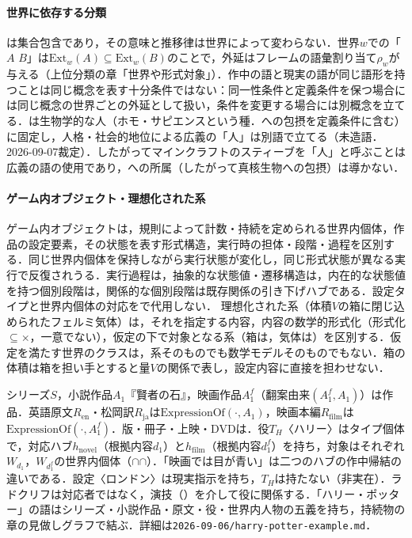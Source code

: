 \documentclass[../../main-detail.tex]{subfiles}
\begin{document}
\paragraph{世界に依存する分類} は集合包含であり，その意味と推移律は世界によって変わらない．世界$w$での「$A$  $B$」は$\mathrm{Ext}_w(A)\subseteq\mathrm{Ext}_w(B)$のことで，外延はフレームの語彙割り当て$\rho_w$が与える（上位分類の章「世界や形式対象」）．作中の語と現実の語が同じ語形を持つことは同じ概念を表す十分条件ではない：同一性条件と定義条件を保つ場合には同じ概念の世界ごとの外延として扱い，条件を変更する場合には別概念を立てる．は生物学的な人（ホモ・サピエンスという種．への包摂を定義条件に含む）に固定し，人格・社会的地位による広義の「人」は別語で立てる（未造語．2026-09-07裁定）．したがってマインクラフトのスティーブを「人」と呼ぶことは広義の語の使用であり，への所属（したがって真核生物への包摂）は導かない．

\paragraph{ゲーム内オブジェクト・理想化された系} ゲーム内オブジェクトは，規則によって計数・持続を定められる世界内個体，作品の設定要素，その状態を表す形式構造，実行時の担体・段階・過程を区別する．同じ世界内個体を保持しながら実行状態が変化し，同じ形式状態が異なる実行で反復されうる．実行過程は，抽象的な状態値・遷移構造は，内在的な状態値を持つ個別段階は，関係的な個別段階は既存関係の引き下げハブである．設定タイプと世界内個体の対応をで代用しない．
理想化された系（体積$V$の箱に閉じ込められたフェルミ気体）は，それを指定する内容，内容の数学的形式化（形式化$\subseteq$$\times$，一意でない），仮定の下で対象となる系（箱は，気体は）を区別する．仮定を満たす世界のクラスは，系そのものでも数学モデルそのものでもない．箱の体積は箱を担い手とすると量$V$の関係で表し，設定内容に直接を担わせない．

\begin{example}
シリーズ$S$，小説作品$A_1$『賢者の石』，映画作品$A_1^f$（翻案由来$(A_1^f,A_1)$）は作品．英語原文$R_{\mathrm{en}}$・松岡訳$R_{\mathrm{ja}}$は$\text{ExpressionOf}(\cdot,A_1)$，映画本編$R_{\mathrm{film}}$は$\text{ExpressionOf}(\cdot,A_1^f)$．版・冊子・上映・DVDは．役$T_H$〈ハリー〉はタイプ個体で，対応ハブ$h_{\mathrm{novel}}$（根拠内容$d_1$）と$h_{\mathrm{film}}$（根拠内容$d_1^f$）を持ち，対象はそれぞれ$W_{d_1}$，$W_{d_1^f}$の世界内個体（$\cap$$\cap$）．「映画では目が青い」は二つのハブの作中帰結の違いである．設定〈ロンドン〉は現実指示を持ち，$T_H$は持たない（非実在）．ラドクリフは対応者ではなく，演技（）を介して役に関係する．「ハリー・ポッター」の語はシリーズ・小説作品・原文・役・世界内人物の五義を持ち，持続物の章の見做しグラフで結ぶ．詳細は\texttt{2026-09-06/harry-potter-example.md}．
\end{example}
\end{document}
